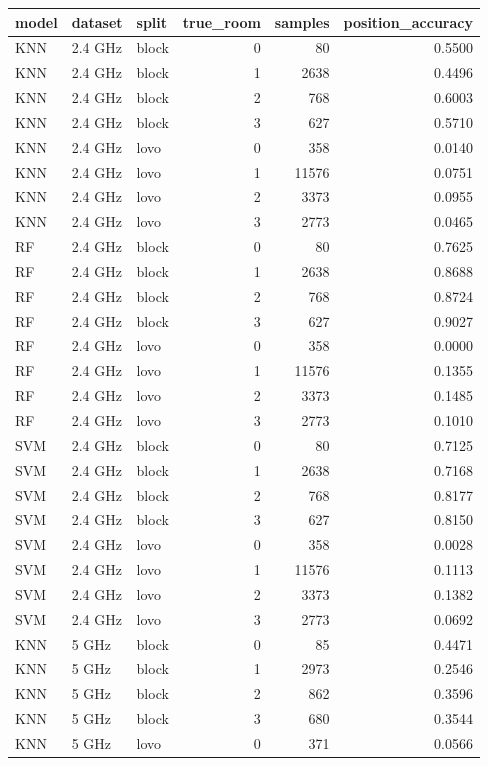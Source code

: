 \begin{tabular}{lllrrr}
\toprule
model & dataset & split & true_room & samples & position_accuracy \\
\midrule
KNN & 2.4 GHz & block & 0 & 80 & 0.5500 \\
KNN & 2.4 GHz & block & 1 & 2638 & 0.4496 \\
KNN & 2.4 GHz & block & 2 & 768 & 0.6003 \\
KNN & 2.4 GHz & block & 3 & 627 & 0.5710 \\
KNN & 2.4 GHz & lovo & 0 & 358 & 0.0140 \\
KNN & 2.4 GHz & lovo & 1 & 11576 & 0.0751 \\
KNN & 2.4 GHz & lovo & 2 & 3373 & 0.0955 \\
KNN & 2.4 GHz & lovo & 3 & 2773 & 0.0465 \\
RF & 2.4 GHz & block & 0 & 80 & 0.7625 \\
RF & 2.4 GHz & block & 1 & 2638 & 0.8688 \\
RF & 2.4 GHz & block & 2 & 768 & 0.8724 \\
RF & 2.4 GHz & block & 3 & 627 & 0.9027 \\
RF & 2.4 GHz & lovo & 0 & 358 & 0.0000 \\
RF & 2.4 GHz & lovo & 1 & 11576 & 0.1355 \\
RF & 2.4 GHz & lovo & 2 & 3373 & 0.1485 \\
RF & 2.4 GHz & lovo & 3 & 2773 & 0.1010 \\
SVM & 2.4 GHz & block & 0 & 80 & 0.7125 \\
SVM & 2.4 GHz & block & 1 & 2638 & 0.7168 \\
SVM & 2.4 GHz & block & 2 & 768 & 0.8177 \\
SVM & 2.4 GHz & block & 3 & 627 & 0.8150 \\
SVM & 2.4 GHz & lovo & 0 & 358 & 0.0028 \\
SVM & 2.4 GHz & lovo & 1 & 11576 & 0.1113 \\
SVM & 2.4 GHz & lovo & 2 & 3373 & 0.1382 \\
SVM & 2.4 GHz & lovo & 3 & 2773 & 0.0692 \\
KNN & 5 GHz & block & 0 & 85 & 0.4471 \\
KNN & 5 GHz & block & 1 & 2973 & 0.2546 \\
KNN & 5 GHz & block & 2 & 862 & 0.3596 \\
KNN & 5 GHz & block & 3 & 680 & 0.3544 \\
KNN & 5 GHz & lovo & 0 & 371 & 0.0566 \\

\end{tabular}
